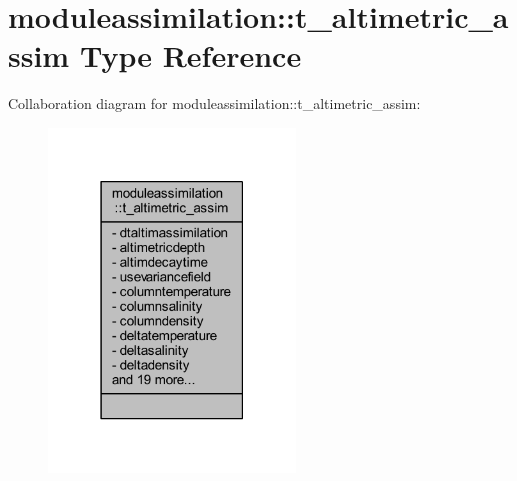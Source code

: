 \hypertarget{structmoduleassimilation_1_1t__altimetric__assim}{}\section{moduleassimilation\+:\+:t\+\_\+altimetric\+\_\+assim Type Reference}
\label{structmoduleassimilation_1_1t__altimetric__assim}


Collaboration diagram for moduleassimilation\+:\+:t\+\_\+altimetric\+\_\+assim\+:\nopagebreak
\begin{figure}[H]
\begin{center}
\leavevmode
\includegraphics[width=186pt]{structmoduleassimilation_1_1t__altimetric__assim__coll__graph}
\end{center}
\end{figure}
